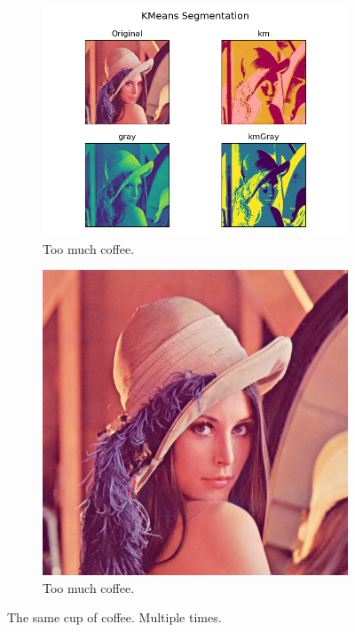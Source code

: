 \documentclass{article}
\begin{document}
\begin{figure}[h!]
\begin{subfigure}[b]{0.4\linewidth}
    \includegraphics[width=\linewidth]{kMeans.png}
    \caption{Too much coffee.}
  \end{subfigure}
  \begin{subfigure}[b]{0.4\linewidth}
    \includegraphics[width=\linewidth]{Lenna.png}
    \caption{Too much coffee.}
  \end{subfigure}
  \caption{The same cup of coffee. Multiple times.}
  \label{fig:coffee3}
\end{figure}
\end{document}

